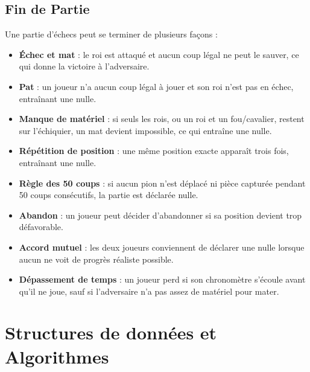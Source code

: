 \documentclass{article}
\begin{document}
\subsection{Fin de Partie}
Une partie d'échecs peut se terminer de plusieurs façons :
\begin{itemize}
    \item \textbf{Échec et mat} : le roi est attaqué et aucun coup légal ne peut le sauver, ce qui donne la victoire à l'adversaire.
    \item \textbf{Pat} : un joueur n'a aucun coup légal à jouer et son roi n'est pas en échec, entraînant une nulle.
    \item \textbf{Manque de matériel} : si seuls les rois, ou un roi et un fou/cavalier, restent sur l'échiquier, un mat devient impossible, ce qui entraîne une nulle.
    \item \textbf{Répétition de position} : une même position exacte apparaît trois fois, entraînant une nulle.
    \item \textbf{Règle des 50 coups} : si aucun pion n'est déplacé ni pièce capturée pendant 50 coups consécutifs, la partie est déclarée nulle.
    \item \textbf{Abandon} : un joueur peut décider d'abandonner si sa position devient trop défavorable.
    \item \textbf{Accord mutuel} : les deux joueurs conviennent de déclarer une nulle lorsque aucun ne voit de progrès réaliste possible.
    \item \textbf{Dépassement de temps} : un joueur perd si son chronomètre s'écoule avant qu'il ne joue, sauf si l'adversaire n'a pas assez de matériel pour mater.
\end{itemize}



\section{Structures de données et Algorithmes}
\label{DataStruct}
\end{document}
